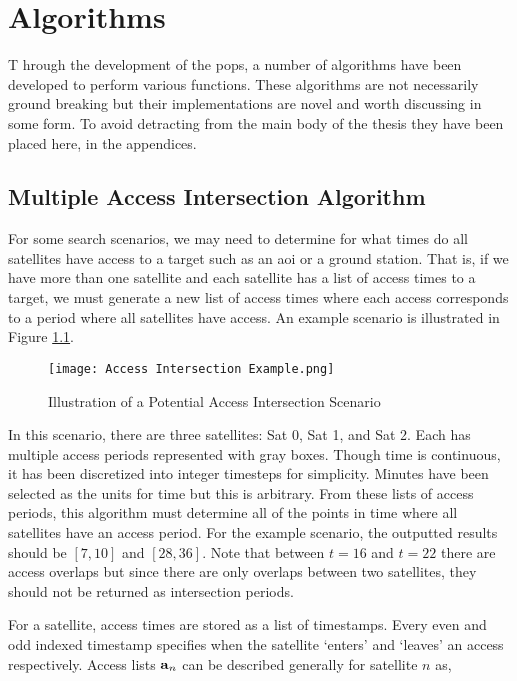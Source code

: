 \glsresetall{} 
\appendix

\chapter{Algorithms} \label{chap:Algorithms}

\lettrine[lines=2, findent=0pt, nindent=5pt]{T}{} hrough the development of the
\gls{pops}, a number of algorithms have been developed to perform various
functions. These algorithms are not necessarily ground breaking but their
implementations are novel and worth discussing in some form. To avoid
detracting from the main body of the thesis they have been placed here, in the
appendices.


\section{Multiple Access Intersection Algorithm} \label{alg:mul-access-inter}

For some search scenarios, we may need to determine for what times do all
satellites have access to a target such as an \gls{aoi} or a ground station.
That is, if we have more than one satellite and each satellite has a list of
access times to a target, we must generate a new list of access times where
each access corresponds to a period where all satellites have access. An
example scenario is illustrated in Figure \ref{fig:access_intersect}.


\begin{figure}[h]
    \texttt{[image: Access Intersection Example.png]} 
    \caption{Illustration of a Potential Access Intersection Scenario}
\label{fig:access_intersect}
\end{figure}

In this scenario, there are three satellites: Sat 0, Sat 1, and Sat 2. Each has
multiple access periods represented with gray boxes. Though time is continuous,
it has been discretized into integer timesteps for simplicity. Minutes have
been selected as the units for time but this is arbitrary. From these lists of
access periods, this algorithm must determine all of the points in time where
all satellites have an access period. For the example scenario, the outputted
results should be $[7,10]$ and $[28,36]$. Note that between $t = 16$ and $t=22$
there are access overlaps but since there are only overlaps between two
satellites, they should not be returned as intersection periods.

For a satellite, access times are stored as a list of timestamps. Every even
and odd indexed timestamp specifies when the satellite `enters' and `leaves' an
access respectively. Access lists $\bm{\mathrm{a}}_{n}$ can be described generally for satellite $n$ as,


